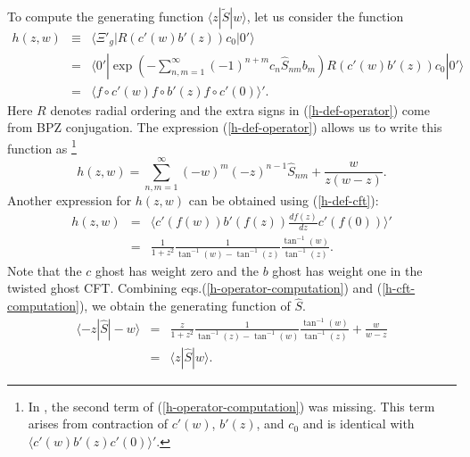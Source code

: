 \documentclass[a4paper,12pt]{article}
\begin{document}
To compute the generating function $\langle z|\widetilde{S}|w\rangle$,
let us consider the function \cite{GRSZstructure}
\begin{eqnarray}
h(z,w) &\equiv& \langle\Xi'_g|R( c'(w)b'(z))c_0|0'\rangle\nonumber\\
&=&\langle 0'|\exp(-\sum_{n,m=1}^{\infty}(-1)^{n+m}c_n
\widehat{S}_{nm}b_m)R( c'(w)b'(z))c_0|0'\rangle \label{h-def-operator}\\
&=& \langle f\circ c'(w) f\circ b'(z) f\circ c'(0) \rangle'.
\label{h-def-cft}
\end{eqnarray}
Here $R$ denotes radial ordering and the extra signs in
(\ref{h-def-operator}) come from BPZ conjugation. The expression
(\ref{h-def-operator}) allows us to write this function as
\footnote{In \cite{GRSZstructure}, the second term of
(\ref{h-operator-computation}) was missing. This term arises from
contraction of $c'(w)$, $b'(z)$, and $c_0$ and is identical with
$\langle c'(w)b'(z)c'(0)\rangle '$.}
\begin{equation}\label{h-operator-computation}
h(z,w)=\sum_{n,m=1}^{\infty} (-w)^m (-z)^{n-1}\widehat{S}_{nm}
+\frac{w}{z(w-z)}.
\end{equation}
Another expression for $h(z,w)$ can be obtained using (\ref{h-def-cft}):
\begin{eqnarray}\label{h-cft-computation}
h(z,w)&=&\langle c'(f(w))b'(f(z))\frac{d f(z)}{dz} c'(f(0))\rangle' \nonumber\\
&=&\frac{1}{1+z^2}\frac{1}{\tan^{-1}(w)-\tan^{-1}(z)}
\frac{\tan^{-1}(w)}{\tan^{-1}(z)}.
\end{eqnarray}
Note that the $c$ ghost has weight zero and the $b$ ghost has weight one in
the twisted ghost CFT.
Combining eqs.(\ref{h-operator-computation}) and (\ref{h-cft-computation}),
we obtain the generating function of $\widehat{S}$.
\begin{eqnarray}
\langle -z|\widehat{S}|-w\rangle &=&
\frac{z}{1+z^2}\frac{1}{\tan^{-1}(z)-\tan^{-1}(w)}
\frac{\tan^{-1}(w)}{\tan^{-1}(z)} + \frac{w}{w-z} \nonumber\\
&=&\langle z|\widehat{S}|w\rangle\label{S-hat-generating-function}.
\end{eqnarray}
\end{document}
